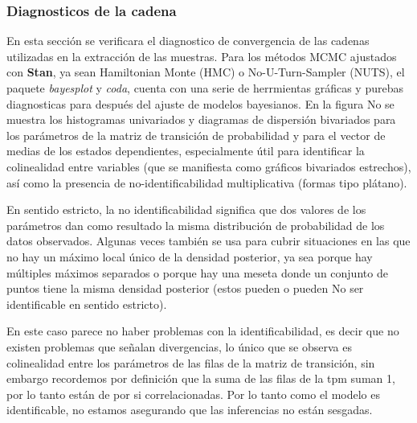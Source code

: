 \documentclass[a4paper]{article}\usepackage[]{graphicx}\usepackage[]{color}
\begin{document}
\subsubsection*{Diagnosticos de la cadena}

En esta sección se verificara el diagnostico de convergencia de las cadenas utilizadas en la extracción de las muestras. Para los métodos MCMC ajustados con \textbf{Stan}, ya sean Hamiltonian Monte (HMC) o No-U-Turn-Sampler (NUTS), el paquete \emph{bayesplot} y \emph{coda}, cuenta con una serie de herrmientas gráficas y purebas diagnosticas para después del ajuste de modelos bayesianos. En la figura No se muestra los histogramas univariados y diagramas de dispersión bivariados para los parámetros de la matriz de transición de probabilidad y para el vector de medias de los estados dependientes, especialmente útil para identificar la colinealidad entre variables (que se manifiesta como gráficos bivariados estrechos), así como la presencia de no-identificabilidad multiplicativa (formas tipo plátano).

En sentido estricto, la no identificabilidad significa que dos valores de los parámetros dan como resultado la misma distribución de probabilidad de los datos observados. Algunas veces también se usa para cubrir situaciones en las que no hay un máximo local único de la densidad posterior, ya sea porque hay múltiples máximos separados o porque hay una meseta donde un conjunto de puntos tiene la misma densidad posterior (estos pueden o pueden No ser identificable en sentido estricto).

En este caso parece no haber problemas con la identificabilidad, es decir que no existen problemas que señalan divergencias, lo único que se observa es colinealidad entre los parámetros de las filas de la matriz de transición, sin embargo recordemos por definición que la suma de las filas de la tpm suman 1, por lo tanto están de por si correlacionadas. Por lo tanto como el modelo es identificable, no estamos asegurando que las inferencias no están sesgadas.
\end{document}
